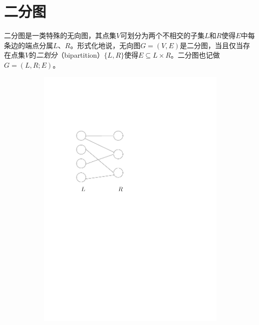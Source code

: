 \documentclass[a4paper]{ctexbook}
\begin{document}
  \section{二分图}
  二分图是一类特殊的无向图，其点集$V$可划分为两个不相交的子集$L$和$R$使得$E$中每条边的端点分属$L$、$R$。形式化地说，无向图$G=(V,E)$是二分图，当且仅当存在点集$V$的\emph{二划分}（bipartition）$\{L,R\}$使得$E\subseteq L\times R$。二分图也记做$G=(L,R;E)$。
  \begin{figure}
    \centering
    \begin{subfigure}[t]{0.4\linewidth}
      \centering
      \includegraphics[scale=0.5]{figures/bipartite-graph}
      \caption{}
    \end{subfigure}
    \begin{subfigure}[t]{0.4\linewidth}
      \centering

\end{subfigure}
\end{figure}
\end{document}
